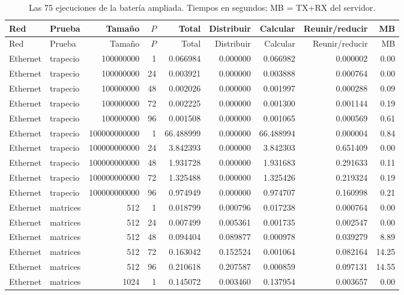 \begin{longtable}{llrrrrrrr}
\caption{Las 75 ejecuciones de la batería ampliada. Tiempos en segundos; MB = TX+RX del servidor.}\label{tab:ampliada-completa}\\
\toprule Red & Prueba & Tamaño & $P$ & Total & Distribuir & Calcular & Reunir/reducir & MB \\
\midrule\endfirsthead
\toprule Red & Prueba & Tamaño & $P$ & Total & Distribuir & Calcular & Reunir/reducir & MB \\
\midrule\endhead
Ethernet & trapecio & 100000000 & 1 & 0.066984 & 0.000000 & 0.066982 & 0.000002 & 0.00 \\
Ethernet & trapecio & 100000000 & 24 & 0.003921 & 0.000000 & 0.003888 & 0.000764 & 0.00 \\
Ethernet & trapecio & 100000000 & 48 & 0.002026 & 0.000000 & 0.001997 & 0.000288 & 0.09 \\
Ethernet & trapecio & 100000000 & 72 & 0.002225 & 0.000000 & 0.001300 & 0.001144 & 0.19 \\
Ethernet & trapecio & 100000000 & 96 & 0.001508 & 0.000000 & 0.001065 & 0.000569 & 0.61 \\
Ethernet & trapecio & 100000000000 & 1 & 66.488999 & 0.000000 & 66.488994 & 0.000004 & 0.84 \\
Ethernet & trapecio & 100000000000 & 24 & 3.842393 & 0.000000 & 3.842303 & 0.651409 & 0.00 \\
Ethernet & trapecio & 100000000000 & 48 & 1.931728 & 0.000000 & 1.931683 & 0.291633 & 0.11 \\
Ethernet & trapecio & 100000000000 & 72 & 1.325488 & 0.000000 & 1.325426 & 0.219324 & 0.19 \\
Ethernet & trapecio & 100000000000 & 96 & 0.974949 & 0.000000 & 0.974707 & 0.160998 & 0.21 \\
Ethernet & matrices & 512 & 1 & 0.018799 & 0.000796 & 0.017238 & 0.000764 & 0.00 \\
Ethernet & matrices & 512 & 24 & 0.007499 & 0.005361 & 0.001735 & 0.002547 & 0.00 \\
Ethernet & matrices & 512 & 48 & 0.094404 & 0.089877 & 0.000978 & 0.039279 & 8.89 \\
Ethernet & matrices & 512 & 72 & 0.163042 & 0.152524 & 0.001064 & 0.082164 & 14.25 \\
Ethernet & matrices & 512 & 96 & 0.210618 & 0.207587 & 0.000859 & 0.097131 & 14.55 \\
Ethernet & matrices & 1024 & 1 & 0.145072 & 0.003460 & 0.137954 & 0.003657 & 0.00 \\

\end{longtable}
